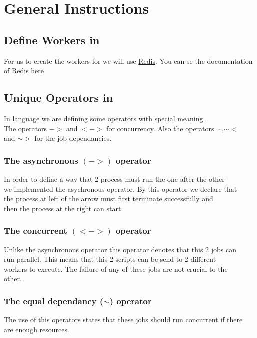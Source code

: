 \section{General Instructions}
\label{sect:general}

\subsection*{Define Workers in \lang{}}
For us to create the workers for \lang{} we will use \href{http://www.redis.io}{Redis}.
You can se the documentation of Redis \href{http://redis.io/documentation}{here}
\subsection*{Unique Operators in \lang{}}

In \lang{} language we are defining some operators with special meaning.\\
The operators $->$ and $<->$ for concurrency. Also the operators $\sim$,$\sim<$\\and $\sim>$ for the job dependancies.\\
\subsubsection*{The asynchronous $(->)$ operator}
In order to define a way that 2 process must run the one after the other\\
we implemented the asychronous operator. By this operator we declare that\\
the process at left of the arrow must first terminate successfully and\\
then the process at the right can start.
\subsubsection*{The concurrent $(<->)$ operator}
Unlike the asynchronous operator this operator denotes that this 2 jobs can\\
run parallel. This means that this 2 scripts can be send to 2 different\\
workers to execute. The failure of any of these jobs are not crucial to the\\
other.
\subsubsection*{The equal dependancy ($\sim$) operator}
The use of this operators states that these jobs should run concurrent if there\\
are enough resources.
